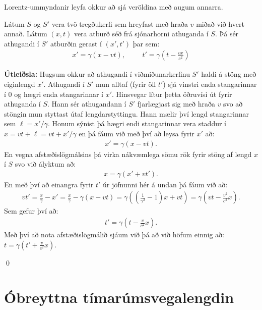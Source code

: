Lorentz-ummyndanir leyfa okkur að sjá veröldina með augum annarra.

\begin{tcolorbox}
\begin{theorem}
Látum $S$ og $S'$ vera tvö tregðukerfi sem hreyfast með hraða $v$ miðað við hvert annað. Látum $(x,t)$ vera atburð séð frá sjónarhorni athuganda í $S$. Þá sér athugandi í $S'$ atburðin gerast í $(x',t')$ þar sem:
\begin{align*}
    x' = \gamma (x - vt), \hspace{1cm} t' = \gamma \left( t - \frac{vx}{c^2} \right)
\end{align*}
\end{theorem}
\end{tcolorbox}

\textbf{Útleiðsla:} Hugsum okkur að athugandi í viðmiðunarkerfinu $S'$ haldi á stöng með eiginlengd $x'$. Athugandi í $S'$ mun alltaf (fyrir öll $t'$) sjá vinstri enda stangarinnar í $0$ og hægri enda stangarinnar í $x'$. Hinsvegar lítur þetta öðruvísi út fyrir athuganda í $S$. Hann sér athugandann í $S'$ fjarlægjast sig með hraða $v$ svo að stöngin mun styttast útaf lengdarstyttingu. Hann mælir því lengd stangarinnar sem $\ell = x'/\gamma$. Honum sýnist þá hægri endi stangarinnar vera staddur í $x = vt + \ell = vt + x'/\gamma$ en þá fáum við með því að leysa fyrir $x'$ að:
\begin{align*}
    x' = \gamma\left(x- vt\right).
\end{align*}
En vegna afstæðislögmálsins þá virka nákvæmlega sömu rök fyrir stöng af lengd $x$ í $S$ svo við ályktum að:
\begin{align*}
    x = \gamma \left(x' + vt' \right).
\end{align*}
En með því að einangra fyrir $t'$ úr jöfnunni hér á undan þá fáum við að:
\begin{align*}
    vt' = \frac{x}{\gamma} - x' = \frac{x}{\gamma} - \gamma \left( x - vt \right) = \gamma \left( \left( \frac{1}{\gamma^2} - 1 \right)x + vt\right) = \gamma \left( vt - \frac{v^2}{c^2}x \right).
\end{align*}
Sem gefur því að:
\begin{align*}
    t' = \gamma \left( t - \frac{v}{c^2}x \right).
\end{align*}
Með því að nota afstæðislögmálið sjáum við þá að við höfum einnig að: $t = \gamma \left( t' + \frac{v}{c^2}x \right)$.

\qed

\section{Óbreyttna tímarúmsvegalengdin}

